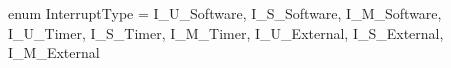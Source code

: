 enum InterruptType = {
  I_U_Software,
  I_S_Software,
  I_M_Software,
  I_U_Timer,
  I_S_Timer,
  I_M_Timer,
  I_U_External,
  I_S_External,
  I_M_External
}
